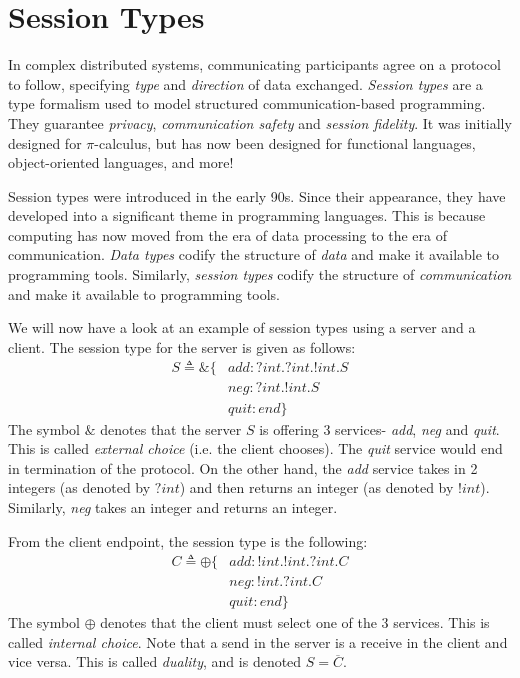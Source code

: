 \documentclass[a4paper, openany]{memoir}
\theoremstyle{definition}
\begin{document}
    \section{Session Types}
    In complex distributed systems, communicating participants agree on a protocol to follow, specifying \emph{type} and \emph{direction} of data exchanged. \emph{Session types} are a type formalism used to model structured communication-based programming. They guarantee \emph{privacy}, \emph{communication safety} and \emph{session fidelity}. It was initially designed for $\pi$-calculus, but has now been designed for functional languages, object-oriented languages, and more!

    Session types were introduced in the early 90s. Since their appearance, they have developed into a significant theme in programming languages. This is because computing has now moved from the era of data processing to the era of communication. \emph{Data types} codify the structure of \emph{data} and make it available to programming tools. Similarly, \emph{session types} codify the structure of \emph{communication} and make it available to programming tools.

    We will now have a look at an example of session types using a server and a client. The session type for the server is given as follows:
    \begin{align*}
        S \triangleq \&  \{ &\textit{add} \colon ?\textit{int}. ?\textit{int}. !\textit{int}. S \\
        & \textit{neg} \colon ?\textit{int}. !\textit{int}. S \\
        & \textit{quit} \colon \textit{end} \}
    \end{align*}
    The symbol $\&$ denotes that the server $S$ is offering 3 services- \textit{add}, \textit{neg} and \textit{quit}. This is called \emph{external choice} (i.e. the client chooses). The \textit{quit} service would end in termination of the protocol. On the other hand, the \textit{add} service takes in 2 integers (as denoted by $?\textit{int}$) and then returns an integer (as denoted by $!\textit{int}$). Similarly, \textit{neg} takes an integer and returns an integer.

    From the client endpoint, the session type is the following:
    \begin{align*}
        C \triangleq \oplus \{ &\textit{add} \colon !\textit{int}. !\textit{int}. ?\textit{int}. C \\
        & \textit{neg} \colon !\textit{int}. ?\textit{int}. C \\
        & \textit{quit} \colon \textit{end} \}
    \end{align*}
    The symbol $\oplus$ denotes that the client must select one of the 3 services. This is called \emph{internal choice}. Note that a send in the server is a receive in the client and vice versa. This is called \emph{duality}, and is denoted $S = \overline{C}$.
\end{document}
